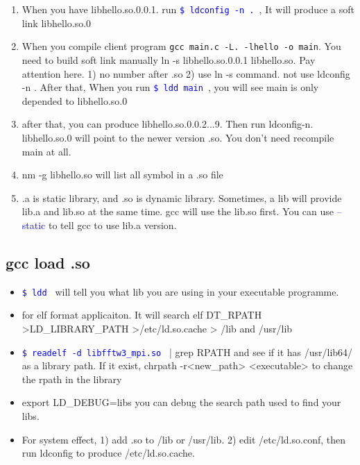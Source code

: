 \documentclass[a4paper,12pt,twoside]{book}
\newcommand{\linuxcommand}[1]{\texttt{\textcolor{blue}{\$ #1 \Pisymbol{psy}{191}}}}
\newcommand{\op}[1]{\textcolor{blue}{-#1}}
\begin{document}
\begin{itemize}
\begin{itemize}
\begin{enumerate}
		\item When you have libhello.so.0.0.1. run \linuxcommand{ldconfig -n .}, It will produce a soft link libhello.so.0
		\item When you compile client program
		\verb=gcc main.c -L. -lhello -o main=. You need to build soft link manually 
		ln -s libhello.so.0.0.1 libhello.so. Pay attention here. 1) no number after .so 2) use ln -s command. not use ldconfig -n . After that, When you run \linuxcommand{ldd main}, you will see main is only depended to libhello.so.0
		
		\item after that, you can produce libhello.so.0.0.2...9. Then run ldconfig-n. libhello.so.0 will point to the newer version .so. You don't need recompile main at all.  
		\item nm -g libhello.so will list all symbol in a .so file
		
		  \item .a is static library, and .so is dynamic library. Sometimes, a lib will provide lib.a
        and lib.so at the same time. gcc will use the lib.so first. You can use \op{-static} to tell
        gcc to use lib.a version.
		       
       \end{enumerate}
\end{itemize}
\subsection{gcc load .so}

		\begin{itemize}
  		 \item \linuxcommand{ldd} will tell you what lib you are using in your executable programme.

				\item for elf format applicaiton. It will search elf DT\_RPATH >LD\_LIBRARY\_PATH >/etc/ld.so.cache > /lib and /usr/lib

				\item \linuxcommand{readelf -d libfftw3\_mpi.so} | grep RPATH and see if it has /usr/lib64/ as a library path. If it exist, chrpath -r<new\_path> <executable> to change the rpath in the library 

				\item export LD\_DEBUG=libs you can debug the search path used to find your libs.

				\item For system effect, 1) add .so to /lib or /usr/lib. 2) edit /etc/ld.so.conf, then run ldconfig to produce /etc/ld.so.cache.


\end{itemize}
\end{itemize}
\end{document}
